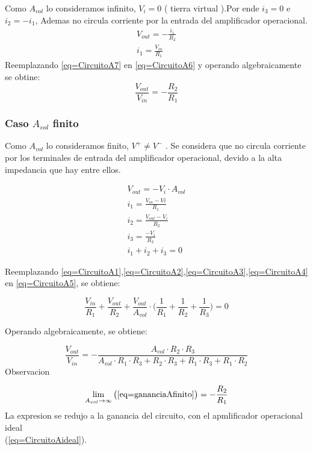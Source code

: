 \documentclass[../../main.tex]{subfiles}
\begin{document}
Como $A_{vol}$ lo consideramos infinito, $V_{i}=0$ \big( tierra virtual \big).Por ende $i_{3}=0$ e $i_{2}=-i_{1}$, Ademas no circula corriente por la entrada del   amplificador operacional.
\begin{gather}
V_{out}=-\frac{i_{1}}{R_{2}}\label{eq=CircuitoA6}\\
i_{1}=\frac{V_{in}}{R_{1}}\label{eq=CircuitoA7}
\end{gather}
Reemplazando \ref{eq=CircuitoA7} en \ref{eq=CircuitoA6} y operando algebraicamente se obtine:
\begin{equation}
\frac{V_{out}}{V_{in}}= -\frac{R_{2}}{R_{1}} \label{eq=CircuitoAideal}
\end{equation}


\subsubsection{Caso $A_{vol}$ finito}

Como $A_{vol}$  lo consideramos finito, $V^{+}\neq V^{-}$ . Se considera que no circula corriente por  los terminales de entrada del amplificador operacional, devido a la alta impedancia que hay entre ellos.

\begin{gather}
V_{out}= -V_{i}\cdot A_{vol}\label{eq=CircuitoA1}\\
i_{1}=\frac{V_{in}-V{i}}{R_{1}}\label{eq=CircuitoA2}\\
i_{2}=\frac{V_{out}-V_{i}}{R_{2}}\label{eq=CircuitoA3}\\
i_{3}=\frac{-V_{i}}{R_{3}}\label{eq=CircuitoA4}\\
i_{1}+i_{2}+i_{3}=0\label{eq=CircuitoA5}
\end{gather}

Reemplazando \ref{eq=CircuitoA1},\ref{eq=CircuitoA2},\ref{eq=CircuitoA3},\ref{eq=CircuitoA4} en \ref{eq=CircuitoA5}, se obtiene:


$$\frac{V_{in}}{R_{1}} + \frac{V_{out}}{R_{2}}+\frac{V_{out}}{A_{vol}}\cdot \bigg( \frac{1}{R_{1}} + \frac{1}{R_{2}} + \frac{1}{R_{3}} \bigg) = 0$$

Operando algebraicamente, se obtiene:

\begin{equation}
\frac{V_{out}}{V_{in}}= - \frac{A_{vol} \cdot R_{2} \cdot R_{3}}{A_{vol}\cdot R_{1} \cdot R_{3} + R_{2} \cdot R_{3} +  R_{1} \cdot R_{3} + R_{1} \cdot R_{2} }\label{eq=gananciaAfinito}
\end{equation}
Observacion

$$ \lim_{A_{vol}\to\infty} \big( \ref{eq=gananciaAfinito} \big) = -\frac{R_{2}}{R_{1}} $$
La expresion se redujo a la ganancia del circuito, con el apmlificador operacional ideal\\ \big(\ref{eq=CircuitoAideal}\big).
\end{document}
